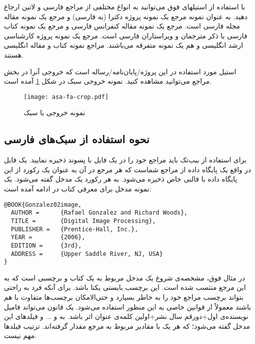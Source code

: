با استفاده از استیلهای فوق می‌توانید به انواع مختلفی از مراجع فارسی و لاتین ارجاع دهید. به عنوان نمونه مرجع 
\cite{Omidali82phdThesis}
 یک نمونه پروژه دکترا (به فارسی) و مرجع 
\cite{Vahedi87} یک نمونه مقاله مجله فارسی است.
مرجع 
\cite{Amintoosi87afzayesh}  یک نمونه  مقاله کنفرانس فارسی و
مرجع 
\cite{Pedram80osool} یک نمونه کتاب فارسی با ذکر مترجمان و ویراستاران فارسی است. مرجع 
\cite{Khalighi07MscThesis} یک نمونه پروژه کارشناسی ارشد انگلیسی و
\cite{Khalighi87xepersian} هم یک نمونه متفرقه  می‌باشند.
مراجع 
\cite{Gonzalez02book,Baker02limits} 
نمونه کتاب و مقاله انگلیسی هستند.

استیل مورد استفاده در این پروژه/پایان‌نامه/رساله 
است که خروجی آنرا در بخش مراجع می‌توانید مشاهده کنید.
نمونه  خروجی سبک  در شکل \ref{fig:asafa} آمده است.

\begin{figure}[t]
\centering
\texttt{[image: asa-fa-crop.pdf]}
\caption{نمونه خروجی با سبک }
\label{fig:asafa}
\end{figure} 
\subsection{ نحوه استفاده از سبک‌های فارسی}
برای استفاده از بیب‌تک باید مراجع خود را در یک فایل با پسوند  ذخیره نمایید. یک فایل  در واقع یک پایگاه داده از مراجع  شماست که هر مرجع در آن به عنوان یک رکورد از این پایگاه داده
با قالبی خاص ذخیره می‌شود. به هر رکورد یک مدخل گفته می‌شود. یک نمونه مدخل برای معرفی کتاب  در ادامه آمده است:

\singlespacing
\begin{LTR}
\begin{verbatim}
@BOOK{Gonzalez02image,
  AUTHOR =      {Rafael Gonzalez and Richard Woods},
  TITLE =       {Digital Image Processing},
  PUBLISHER =   {Prentice-Hall, Inc.},
  YEAR =        {2006},
  EDITION =     {3rd},
  ADDRESS =     {Upper Saddle River, NJ, USA}
}
\end{verbatim}
\end{LTR}
\doublespacing

در مثال فوق،  مشخصه‌ی شروع یک مدخل مربوط به یک کتاب و  برچسبی است که به این مرجع منتسب شده است.
 این برچسب بایستی یکتا باشد. برای آنکه فرد به راحتی بتواند برچسب مراجع خود را به خاطر بسپارد و حتی‌الامکان برچسب‌ها متفاوت با هم باشند معمولاً از قوانین خاصی به این منظور استفاده می‌شود. یک قانون می‌تواند فامیل نویسنده‌ی اول+دورقم سال نشر+اولین کلمه‌ی عنوان اثر باشد. به  و $\dots$ و  فیلدهای این مدخل گفته می‌شود؛ که هر یک با مقادیر مربوط به مرجع مقدار گرفته‌اند. ترتیب فیلدها مهم نیست. 

